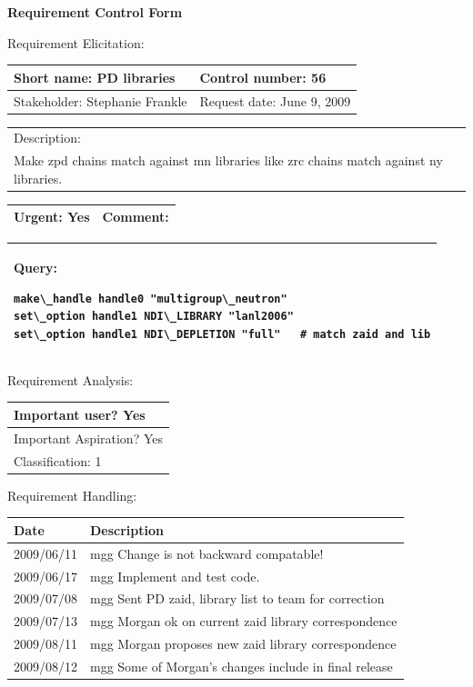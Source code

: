 \begin{center}\Large\bf
Requirement Control Form
\end{center}
\vspace{24pt}

Requirement Elicitation:

\begin{tabular}{|p{211pt}|p{211pt}|} \hline
Short name: PD libraries & Control number: 56\\ \hline
Stakeholder: Stephanie Frankle & Request date: June 9, 2009\\
\end{tabular}
\begin{tabular}{|p{433pt}|} \hline
Description: \\ 
Make zpd chains match against mn libraries like zrc chains match against
ny libraries.\\
\hline
\end{tabular} 
\begin{tabular}{|p{211pt}|p{211pt}|} \hline
Urgent: Yes & Comment: \\ \hline
\end{tabular}

\vspace{12pt}

\begin{tabular}{|p{433pt}|} \hline
Query:
\begin{verbatim}
make\_handle handle0 "multigroup\_neutron"
set\_option handle1 NDI\_LIBRARY "lanl2006"
set\_option handle1 NDI\_DEPLETION "full"   # match zaid and lib
\end{verbatim}
\\ \hline
\end{tabular}
\vspace{24pt}

Requirement Analysis:

\begin{tabular}{|p{433pt}|} \hline
Important user? Yes \\ \hline
Important Aspiration? Yes \\ \hline
Classification: 1 \\ \hline
\end{tabular}
\vspace{24pt}

Requirement Handling:

\begin{tabular}{|p{72pt}|p{351pt}|} \hline
Date & Description \\ \hline
2009/06/11 & mgg Change is not backward compatable! \\
\hline
2009/06/17 & mgg Implement and test code. \\ \hline
2009/07/08 & mgg Sent PD zaid, library list to team for correction \\ \hline
2009/07/13 & mgg Morgan ok on current zaid library correspondence \\
\hline
2009/08/11 & mgg Morgan proposes new zaid library correspondence \\
\hline
2009/08/12 & mgg Some of Morgan's changes include in final release \\ \hline
\end{tabular}
